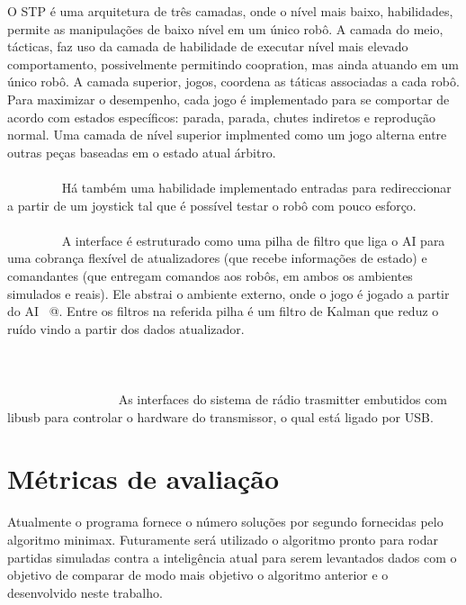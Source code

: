 O STP é uma arquitetura de três camadas, onde o nível mais baixo, habilidades,
permite as manipulações de baixo nível em um único robô. A camada do meio,
tácticas, faz uso da camada de habilidade de executar nível mais elevado
comportamento, possivelmente permitindo coopration, mas ainda atuando em um
único robô. A camada superior, jogos, coordena as táticas associadas a cada
robô. Para maximizar o desempenho, cada jogo é implementado para se comportar de
acordo com estados específicos: parada, parada, chutes indiretos e reprodução normal. 
Uma camada de nível superior implmented como um jogo alterna entre outras peças
baseadas em o estado atual árbitro.
                                                                                
Há também uma habilidade implementado entradas para redireccionar a partir de um
joystick tal que é possível testar o robô com pouco esforço.
                                                                                
A interface é estruturado como uma pilha de filtro que liga o AI para uma
cobrança flexível de atualizadores (que recebe informações de estado) e
  comandantes (que entregam comandos aos robôs, em ambos os ambientes simulados
e reais).
Ele abstrai o ambiente externo, onde o jogo é jogado a partir do AI \ @.
Entre os filtros na referida pilha é um filtro de Kalman que reduz o ruído vindo
a partir dos dados atualizador.
                                                                                                                                                                                                                                         
As interfaces do sistema de rádio trasmitter embutidos com libusb para controlar
o hardware do transmissor, o qual está ligado por USB.

\section{Métricas de avaliação}\label{sec:metricas}

Atualmente o programa fornece o número soluções por segundo fornecidas pelo
algoritmo minimax. Futuramente será utilizado o algoritmo pronto para rodar
partidas simuladas contra a inteligência atual para serem levantados dados com
o objetivo de comparar de modo mais objetivo o algoritmo anterior e o
desenvolvido neste trabalho.
